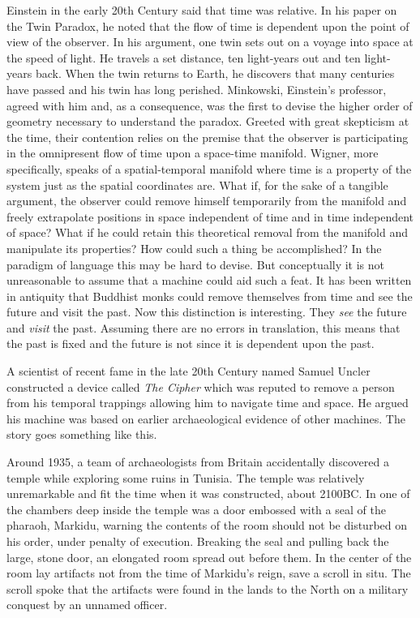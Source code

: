 Einstein in the early 20th Century said that time was relative. In his
paper on the Twin Paradox, he noted that the flow of time is dependent
upon the point of view of the observer. In his argument, one twin sets
out on a voyage into space at the speed of light. He travels a set
distance, ten light-years out and ten light-years back. When the twin
returns to Earth, he discovers that many centuries have passed and his
twin has long perished. Minkowski, Einstein's professor, agreed with him
and, as a consequence, was the first to devise the higher order of
geometry necessary to understand the paradox. Greeted with great
skepticism at the time, their contention relies on the premise that the
observer is participating in the omnipresent flow of time upon a
space-time manifold. Wigner, more specifically, speaks of a
spatial-temporal manifold where time is a property of the system just as
the spatial coordinates are. What if, for the sake of a tangible
argument, the observer could remove himself temporarily from the
manifold and freely extrapolate positions in space independent of time
and in time independent of space? What if he could retain this
theoretical removal from the manifold and manipulate its properties? How
could such a thing be accomplished? In the paradigm of language this may
be hard to devise. But conceptually it is not unreasonable to assume
that a machine could aid such a feat. It has been written in antiquity
that Buddhist monks could remove themselves from time and see the future
and visit the past. Now this distinction is interesting. They \emph{see}
the future and \emph{visit} the past. Assuming there are no errors in
translation, this means that the past is fixed and the future is not
since it is dependent upon the past.

A scientist of recent fame in the late 20th Century named Samuel Uncler
constructed a device called \emph{The Cipher} which was reputed to
remove a person from his temporal trappings allowing him to navigate
time and space. He argued his machine was based on earlier
archaeological evidence of other machines. The story goes something like
this.

Around 1935, a team of archaeologists from Britain accidentally
discovered a temple while exploring some ruins in Tunisia. The temple
was relatively unremarkable and fit the time when it was constructed,
about 2100BC. In one of the chambers deep inside the temple was a door
embossed with a seal of the pharaoh, Markidu, warning the contents of
the room should not be disturbed on his order, under penalty of
execution. Breaking the seal and pulling back the large, stone door, an
elongated room spread out before them. In the center of the room lay
artifacts not from the time of Markidu's reign, save a scroll in situ.
The scroll spoke that the artifacts were found in the lands to the North
on a military conquest by an unnamed officer.

